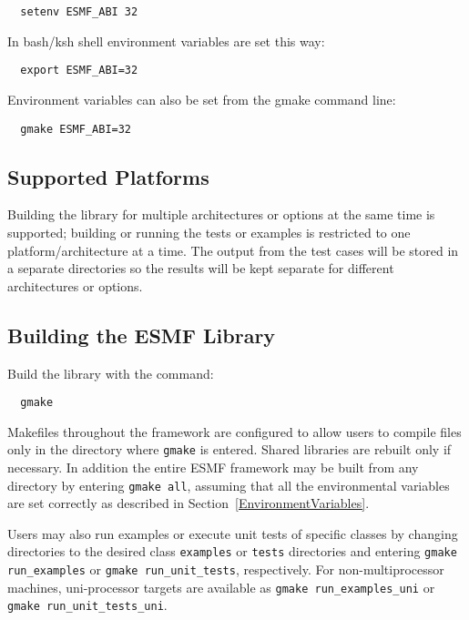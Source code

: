 \begin{verbatim}
  setenv ESMF_ABI 32
\end{verbatim}

In bash/ksh shell environment variables are set this way:

\begin{verbatim}
  export ESMF_ABI=32
\end{verbatim}

Environment variables can also be set from the gmake command line:

\begin{verbatim}
  gmake ESMF_ABI=32
\end{verbatim}

\subsection{Supported Platforms}


Building the library for multiple architectures or options at the same
time is supported; building or running the tests or examples is restricted
to one platform/architecture at a time.  The output from the test cases
will be stored in a separate directories so the results will be kept 
separate for different architectures or options.

\subsection{Building the ESMF Library}
\label{BuildESMF}



Build the library with the command:
\begin{verbatim}
  gmake 
\end{verbatim}


Makefiles throughout the framework are configured to allow users to
compile files only in the directory where {\tt gmake} is entered. Shared
libraries are rebuilt only if necessary. In addition the entire ESMF
framework may be built from any directory by entering {\tt gmake all},
assuming that all the environmental variables are set correctly as
described in Section~\ref{EnvironmentVariables}.

Users may also run examples or execute unit tests of specific classes
by changing directories to the desired class {\tt examples} or {\tt tests} 
directories and entering {\tt gmake run\_examples} or 
{\tt gmake run\_unit\_tests}, respectively.  For non-multiprocessor machines,
uni-processor targets are available as {\tt gmake run\_examples\_uni} or
{\tt gmake run\_unit\_tests\_uni}.

